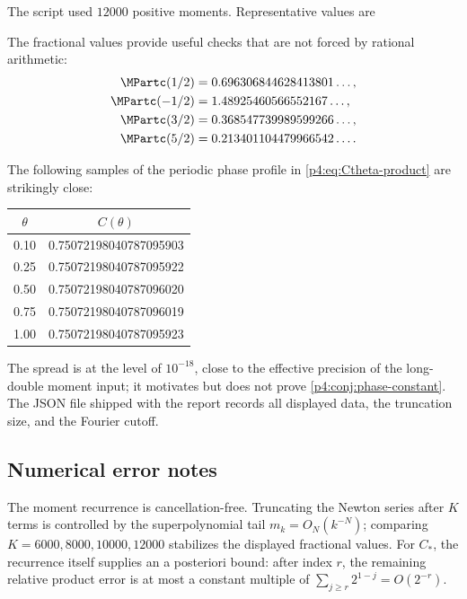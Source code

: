 \documentclass[11pt,oneside]{article}
\theoremstyle{definition}
\theoremstyle{remark}
\newcommand{\1}{\mathbf 1}
\begin{document}
The script used \(12000\) positive moments.  Representative values are
\begin{center}

\end{center}
The fractional values provide useful checks that are not forced by rational arithmetic:
\begin{align}
 \MPartc(1/2)&=0.696306844628413801\ldots,\nonumber\\
 \MPartc(-1/2)&=1.48925460566552167\ldots,\nonumber\\
 \MPartc(3/2)&=0.368547739989599266\ldots,\nonumber\\
 \MPartc(5/2)&=0.213401104479966542\ldots.\label{p4:eq:fractional-numerics}
\end{align}

The following samples of the periodic phase profile in \cref{p4:eq:Ctheta-product} are
strikingly close:
\begin{center}
\begin{tabular}{@{}c@{\qquad}c@{}}
\toprule
\(\theta\)&\(C(\theta)\)\\
\midrule
0.10&0.75072198040787095903\\
0.25&0.75072198040787095922\\
0.50&0.75072198040787096020\\
0.75&0.75072198040787096019\\
1.00&0.75072198040787095923\\
\bottomrule
\end{tabular}
\end{center}
The spread is at the level of \(10^{-18}\), close to the effective precision of the
long-double moment input; it motivates but does not prove \cref{p4:conj:phase-constant}.
The JSON file shipped with the report records all displayed data, the truncation size,
and the Fourier cutoff.

\subsection{Numerical error notes}

The moment recurrence is cancellation-free.  Truncating the Newton series after \(K\)
terms is controlled by the superpolynomial tail \(m_k=O_N(k^{-N})\); comparing
\(K=6000,8000,10000,12000\) stabilizes the displayed fractional values.
For \(C_*\), the recurrence itself supplies an a posteriori bound: after index \(r\),
the remaining relative product error is at most a constant multiple of
\(\sum_{j\ge r}2^{1-j}=O(2^{-r})\).
\end{document}
